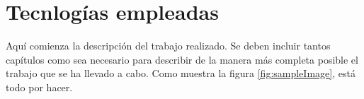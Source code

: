 \chapter{Tecnlogías empleadas}
\label{cap:tecnlogiasEmpleadas}

Aquí comienza la descripción del trabajo realizado. Se deben incluir tantos capítulos como sea necesario para describir de la manera más completa posible el trabajo que se ha llevado a cabo. Como muestra la figura \ref{fig:sampleImage}, está todo por hacer.